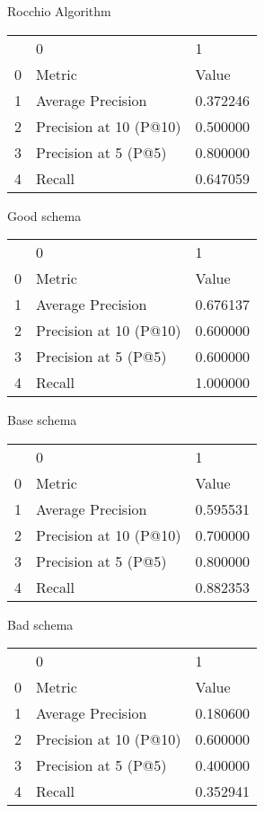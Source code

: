

Rocchio Algorithm
\begin{tabular}{lll}
 & 0 & 1 \\
0 & Metric & Value \\
1 & Average Precision & 0.372246 \\
2 & Precision at 10 (P@10) & 0.500000 \\
3 & Precision at 5 (P@5) & 0.800000 \\
4 & Recall & 0.647059 \\
\end{tabular}


Good schema
\begin{tabular}{lll}
 & 0 & 1 \\
0 & Metric & Value \\
1 & Average Precision & 0.676137 \\
2 & Precision at 10 (P@10) & 0.600000 \\
3 & Precision at 5 (P@5) & 0.600000 \\
4 & Recall & 1.000000 \\
\end{tabular}


Base schema
\begin{tabular}{lll}
 & 0 & 1 \\
0 & Metric & Value \\
1 & Average Precision & 0.595531 \\
2 & Precision at 10 (P@10) & 0.700000 \\
3 & Precision at 5 (P@5) & 0.800000 \\
4 & Recall & 0.882353 \\
\end{tabular}


Bad schema
\begin{tabular}{lll}
 & 0 & 1 \\
0 & Metric & Value \\
1 & Average Precision & 0.180600 \\
2 & Precision at 10 (P@10) & 0.600000 \\
3 & Precision at 5 (P@5) & 0.400000 \\
4 & Recall & 0.352941 \\
\end{tabular}
